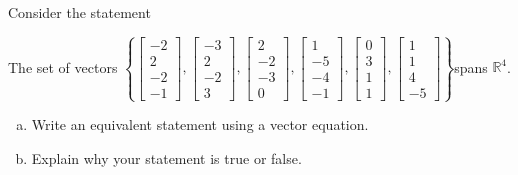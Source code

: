 
\begin{exerciseStatement}


Consider the statement 
\begin{center}\begin{minipage}{0.8\textwidth}
 The set of vectors \( \left\{ \left[\begin{array}{c}
-2 \\
2 \\
-2 \\
-1
\end{array}\right] , \left[\begin{array}{c}
-3 \\
2 \\
-2 \\
3
\end{array}\right] , \left[\begin{array}{c}
2 \\
-2 \\
-3 \\
0
\end{array}\right] , \left[\begin{array}{c}
1 \\
-5 \\
-4 \\
-1
\end{array}\right] , \left[\begin{array}{c}
0 \\
3 \\
1 \\
1
\end{array}\right] , \left[\begin{array}{c}
1 \\
1 \\
4 \\
-5
\end{array}\right] \right\} \)spans \(\mathbb{R}^4\). 
\end{minipage}\end{center}
    


\begin{enumerate}[(a)]
\item  Write an equivalent statement using a vector equation.
\item  Explain why your statement is true or false.
\end{enumerate}
    
\end{exerciseStatement}
    
